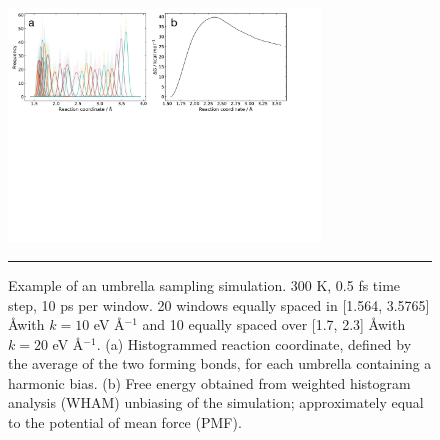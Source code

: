 \documentclass[11pt]{article}
\numberwithin{equation}{subsection}
\begin{document}
\begin{figure}[h!]
	\centering
	\vspace{0.4cm}
	\includegraphics[height=6.2cm]{figSX34.pdf}
	\vspace{0.1cm}
	\hrule
	\vspace{0.1cm}
	\caption{Example of an umbrella sampling simulation. 300 K, 0.5 fs time step, 10 ps per window. 20 windows equally spaced in [1.564, 3.5765] \AA with $k = 10$ eV \AA${}^{-1}$ and 10 equally spaced over [1.7, 2.3] \AA with $k = 20$ eV \AA${}^{-1}$. (a) Histogrammed reaction coordinate, defined by the average of the two forming bonds, for each umbrella containing a harmonic bias. (b) Free energy obtained from weighted histogram analysis (WHAM) unbiasing of the simulation; approximately equal to the potential of mean force (PMF).}
	\label{fig::SX34}
\end{figure}




\clearpage
\printbibliography
\end{document}
